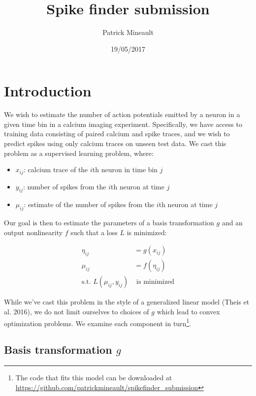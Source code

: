 \documentclass[]{article}
\title{Spike finder submission}
\author{Patrick Mineault}
\date{19/05/2017}
\providecommand{\tightlist}{%
  \setlength{\itemsep}{0pt}\setlength{\parskip}{0pt}}
\begin{document}
\maketitle

\section{Introduction}\label{introduction}

We wish to estimate the number of action potentials emitted by a neuron
in a given time bin in a calcium imaging experiment. Specifically, we
have access to training data consisting of paired calcium and spike
traces, and we wish to predict spikes using only calcium traces on
unseen test data. We cast this problem as a supervised learning problem,
where:

\begin{itemize}
\tightlist
\item
  \(x_{ij}\): calcium trace of the \(i\)th neuron in time bin \(j\)
\item
  \(y_{ij}\): number of spikes from the \(i\)th neuron at time \(j\)
\item
  \(\mu_{ij}\): estimate of the number of spikes from the \(i\)th neuron
  at time \(j\)
\end{itemize}

Our goal is then to estimate the parameters of a basis transformation
\(g\) and an output nonlinearity \(f\) such that a loss \(L\) is
minimized:

\begin{align*}
\eta_{ij} &= g(x_{ij}) \\
\mu_{ij} &= f(\eta_{ij}) \\
\text{s.t. } L(\mu_{ij}, y_{ij}) & \text{ is minimized}
\end{align*}

While we've cast this problem in the style of a generalized linear model
(Theis et al. 2016), we do not limit ourselves to choices of \(g\) which
lead to convex optimization problems. We examine each component in
turn\footnote{The code that fits this model can be downloaded at
  \url{https://github.com/patrickmineault/spikefinder_submission}}.

\subsection{\texorpdfstring{Basis transformation
\(g\)}{Basis transformation g}}\label{basis-transformation-g}
\end{document}
